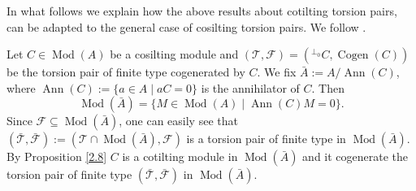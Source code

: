 \documentclass[12pt]{amsart}
\numberwithin{equation}{section}
\theoremstyle{definition}
\DeclareMathOperator{\Mod}{Mod}
\DeclareMathOperator{\Cogen}{Cogen}
\DeclareMathOperator{\Ann}{Ann}
\newtheorem*{theorem 0*}{Theorem}
\newtheorem*{theorem a*}{Theorem A}
\newtheorem*{theorem b*}{Theorem B}
\numberwithin{diagram}{section}
\begin{document}
    In what follows we explain how the above results about cotilting torsion pairs, can be adapted to the general case of cosilting torsion pairs. We follow \cite[Section 4]{ALS2}.
    
    Let $C\in\Mod(A)$ be a cosilting module and $(\mathcal{T},\mathcal{F})=({}^{\bot_0}C,\Cogen(C))$ be the torsion pair of finite type cogenerated by $C$. We fix $\bar{A}:=A/\Ann(C)$, where $\Ann(C):=\{a\in A\mid aC=0\}$ is the annihilator of $C$. Then
    \[\Mod(\bar{A})=\{M\in\Mod(A)\mid \Ann(C)M=0\}.\]
    Since $\mathcal{F}\subseteq\Mod(\bar{A})$, one can easily see that $(\bar{\mathcal{T}},\bar{\mathcal{F}}):=(\mathcal{T}\cap\Mod(\bar{A}),\mathcal{F})$ is a torsion pair of finite type in $\Mod(\bar{A})$.
By Proposition \ref{2.8} $C$ is a cotilting module in $\Mod(\bar{A})$ and it cogenerate the torsion pair of finite type $(\bar{\mathcal{T}},\bar{\mathcal{F}})$ in $\Mod(\bar{A})$.
	
\end{document}
